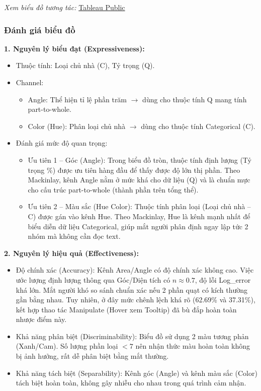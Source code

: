 \noindent\small\textit{Xem biểu đồ tương tác: }\href{https://public.tableau.com/app/profile/duy.le4605/viz/Group10_17788537028430/Task9_1-Proportionofdifferenttypesofhomeowners?publish=yes}{Tableau Public}\normalsize

\subsubsection{Đánh giá biểu đồ}

\textbf{1. Nguyên lý biểu đạt (Expressiveness):}

\begin{itemize}
    \item Thuộc tính: Loại chủ nhà (C), Tỷ trọng (Q).
    \item Channel:
    \begin{itemize}
        \item Angle: Thể hiện tỉ lệ phần trăm $\rightarrow$ dùng cho thuộc tính Q mang tính part-to-whole.
        \item Color (Hue): Phân loại chủ nhà $\rightarrow$ dùng cho thuộc tính Categorical (C).
    \end{itemize}
    \item Đánh giá mức độ quan trọng:
    \begin{itemize}
        \item Ưu tiên 1 -- Góc (Angle): Trong biểu đồ tròn, thuộc tính định lượng (Tỷ trọng \%) được ưu tiên hàng đầu để thấy được độ lớn thị phần. Theo Mackinlay, kênh Angle nằm ở mức khá cho dữ liệu (Q) và là chuẩn mực cho cấu trúc part-to-whole (thành phần trên tổng thể).
        \item Ưu tiên 2 -- Màu sắc (Hue Color): Thuộc tính phân loại (Loại chủ nhà -- C) được gán vào kênh Hue. Theo Mackinlay, Hue là kênh mạnh nhất để biểu diễn dữ liệu Categorical, giúp mắt người phân định ngay lập tức 2 nhóm mà không cần đọc text.
    \end{itemize}
\end{itemize}

\textbf{2. Nguyên lý hiệu quả (Effectiveness):}

\begin{itemize}
    \item Độ chính xác (Accuracy): Kênh Area/Angle có độ chính xác không cao. Việc ước lượng định lượng thông qua Góc/Diện tích có $n \approx 0.7$, độ lỗi Log\_error khá lớn. Mắt người khó so sánh chuẩn xác nếu 2 phần quạt có kích thường gần bằng nhau. Tuy nhiên, ở đây mức chênh lệch khá rõ (62.69\% và 37.31\%), kết hợp thao tác Manipulate (Hover xem Tooltip) đã bù đắp hoàn toàn nhược điểm này.
    \item Khả năng phân biệt (Discriminability): Biểu đồ sử dụng 2 màu tương phản (Xanh/Cam). Số lượng phần loại $< 7$ nên nhận thức màu hoàn toàn không bị ảnh hưởng, rất dễ phân biệt bằng mắt thường.
    \item Khả năng tách biệt (Separability): Kênh góc (Angle) và kênh màu sắc (Color) tách biệt hoàn toàn, không gây nhiễu cho nhau trong quá trình cảm nhận.
\end{itemize}

